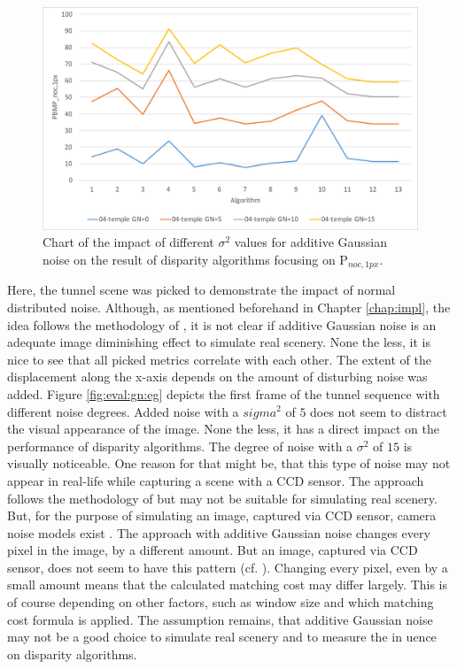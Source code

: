 \begin{figure}[h!]
\centering
\includegraphics[width=1.0\textwidth]{src/images/evaluation/plots/04-temple-gn-overview.pdf}
\caption[Chart of the impact of Gaussian noise]{Chart of the impact of different $\sigma^2$ values for additive Gaussian noise on the result of disparity algorithms focusing on P$_{noc,1px}$.}
\label{fig:eval-plots-gn-overview}
\end{figure}

\noindent Here, the tunnel scene was picked to demonstrate the impact of normal distributed noise.
Although, as mentioned beforehand in Chapter \ref{chap:impl}, the idea follows the methodology of \citeauthor{richardt2010real} \citep{richardt2010real}, it is not clear if additive Gaussian noise is an adequate image diminishing effect to simulate real scenery.
None the less, it is nice to see that all picked metrics correlate with each other.
The extent of the displacement along the x-axis depends on the amount of disturbing noise was added.
Figure \ref{fig:eval:gn:eg} depicts the first frame of the tunnel sequence with different noise degrees.
Added noise with a $sigma^2$ of $5$ does not seem to distract the visual appearance of the image.
None the less, it has a direct impact on the performance of disparity algorithms.
The degree of noise with a $\sigma^2$ of $15$ is visually noticeable.
One reason for that might be, that this type of noise may not appear in real-life while capturing a scene with a CCD sensor.
The approach follows the methodology of \citeauthor{richardt2010real} \citep{richardt2010real} but may not be suitable for simulating real scenery.
But, for the purpose of simulating an image, captured via CCD sensor, camera noise models exist \citep{liu2006noise}.
The approach with additive Gaussian noise changes every pixel in the image, by a different amount.
But an image, captured via CCD sensor, does not seem to have this pattern (cf. \citep{liu2006noise}).
Changing every pixel, even by a small amount means that the calculated matching cost may differ largely.
This is of course depending on other factors, such as window size and which matching cost formula is applied.
The assumption remains, that additive Gaussian noise may not be a good choice to simulate real scenery and to measure the in uence on disparity algorithms.

